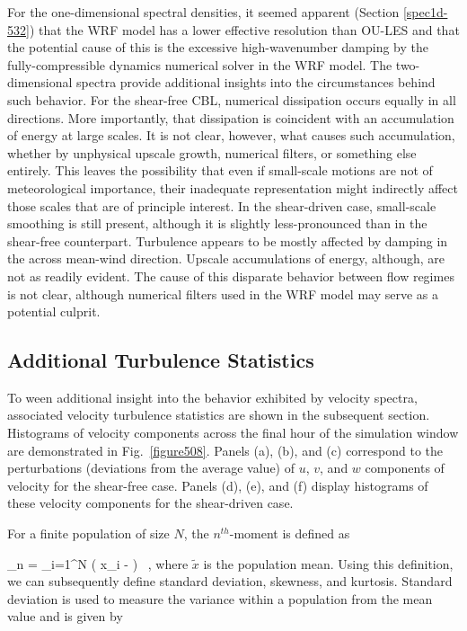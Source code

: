 For the one-dimensional spectral densities, it seemed apparent (Section \autoref{spec1d-532}) that the WRF model has a lower effective resolution than OU-LES and that the potential cause of this is the excessive high-wavenumber damping by the fully-compressible dynamics numerical solver in the WRF model. The two-dimensional spectra provide additional insights into the circumstances behind such behavior. For the shear-free CBL, numerical dissipation occurs equally in all directions. More importantly, that dissipation is coincident with an accumulation of energy at large scales. It is not clear, however, what causes such accumulation, whether by unphysical upscale growth, numerical filters, or something else entirely. This leaves the possibility that even if small-scale motions are not of meteorological importance, their inadequate representation might indirectly affect those scales that are of principle interest. In the shear-driven case, small-scale smoothing is still present, although it is slightly less-pronounced than in the shear-free counterpart. Turbulence appears to be mostly affected by damping in the across mean-wind direction. Upscale accumulations of energy, although, are not as readily evident. The cause of this disparate behavior between flow regimes is not clear, although numerical filters used in the WRF model may serve as a potential culprit.

\subsection{Additional Turbulence Statistics}
\label{turb-stats-534}

To ween additional insight into the behavior exhibited by velocity spectra, associated velocity turbulence statistics are shown in the subsequent section. Histograms of velocity components across the final hour of the simulation window are demonstrated in Fig.~\ref{figure508}. Panels (a), (b), and (c) correspond to the perturbations (deviations from the average value) of $u$, $v$, and $w$ components of velocity for the shear-free case. Panels (d), (e), and (f) display histograms of these velocity components for the shear-driven case.

For a finite population of size $N$, the $n^{th}$-moment is defined as


\be
\mu_n =  \sum_{i=1}^{N} \left( x_i -  \right)  \mbox{ ,}
\label{moment}
\ee
\noindent where $\widetilde{x}$ is the population mean. Using this definition, we can subsequently define standard deviation, skewness, and kurtosis. Standard deviation is used to measure the variance within a population from the mean value and is given by

